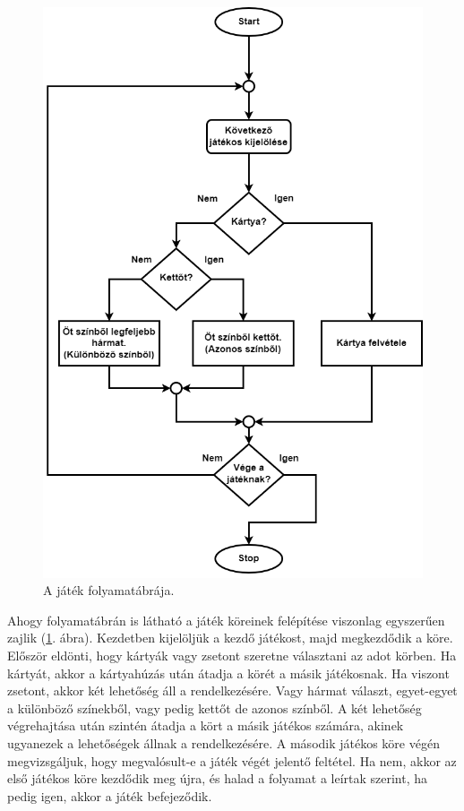 

\begin{figure}[h]
\centering
\includegraphics[scale=0.3]{images/flowchart.png}
\caption{A játék folyamatábrája.}
\label{fig:flowchart}
\end{figure}


Ahogy folyamatábrán is látható a játék köreinek felépítése viszonlag egyszerűen zajlik (\ref{fig:flowchart}. ábra). Kezdetben kijelöljük a kezdő játékost, majd megkezdődik a köre. Először eldönti, hogy kártyák vagy zsetont szeretne választani az adot körben. Ha kártyát, akkor a kártyahúzás után átadja a körét a másik játékosnak. Ha viszont zsetont, akkor két lehetőség áll a rendelkezésére. Vagy hármat választ, egyet-egyet a különböző színekből, vagy pedig kettőt de azonos színből. A két lehetőség végrehajtása után szintén átadja a kört a másik játékos számára, akinek ugyanezek a lehetőségek állnak a rendelkezésére. A második játékos köre végén megvizsgáljuk, hogy megvalósult-e a játék végét jelentő feltétel. Ha nem, akkor az első játékos köre kezdődik meg újra, és halad a folyamat a leírtak szerint, ha pedig igen, akkor a játék befejeződik.


